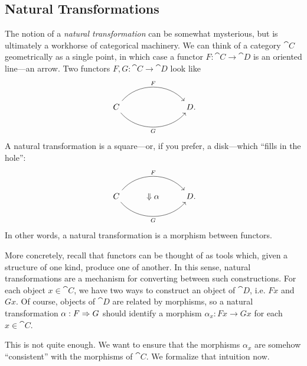 

\subsection{Natural Transformations}

The notion of a \emph{natural transformation} can be somewhat mysterious, but is
ultimately a workhorse of categorical machinery. We can think of a category
$\cat{C}$ geometrically as a single point, in which case a functor $F:
\cat{C}\to\cat{D}$ is an oriented line---an arrow. Two functors $F,G:
\cat{C}\to\cat{D}$ look like \[
  \begin{tikzcd}
    C \ar[rr, "F", bend left=50]\ar[rr, "G"', bend right=50] & \phantom{\Downarrow\alpha} & D\punctuation{.}
  \end{tikzcd}
\]
A natural transformation is a square---or, if you prefer, a disk---which ``fills
in the hole'': \[
  \begin{tikzcd}
    C \ar[rr, "F", bend left=50]\ar[rr, "G"', bend right=50] & \Downarrow\alpha& D\punctuation{.}
  \end{tikzcd}
\]
In other words, a natural transformation is a morphism between functors.

More concretely, recall that functors can be thought of as tools which, given a
structure of one kind, produce one of another. In this sense, natural
transformations are a mechanism for converting between such constructions. For
each object $x\in\cat{C}$, we have two ways to construct an object of $\cat{D}$,
i.e. $Fx$ and $Gx$. Of course, objects of $\cat{D}$ are related by morphisms, so
a natural transformation $\alpha: F\Rightarrow G$ should identify a morphism $\alpha_x:
Fx\to Gx$ for each $x\in\cat{C}$.

This is not quite enough. We want to ensure that the morphisms $\alpha_x$ are
somehow ``consistent'' with the morphisms of $\cat{C}$. We formalize that
intuition now.


